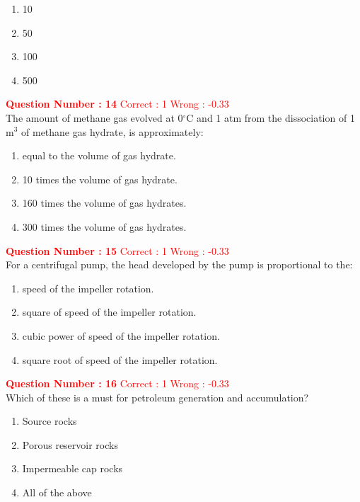 \documentclass[12pt]{article}
\begin{document}
{\begin{enumerate}[label=(\Alph*)]
    \item 10
    \item 50
    \item 100
    \item 500
\end{enumerate}

\vspace{2ex}


\textbf{\textcolor{red}{Question Number : 14}} \hfill \textcolor{red}{Correct : 1  Wrong : -0.33} \\[1ex]
The amount of methane gas evolved at 0$^\circ$C and 1 atm from the dissociation of 1 m$^3$ of methane gas hydrate, is approximately:

\begin{enumerate}[label=(\Alph*)]
    \item equal to the volume of gas hydrate.
    \item 10 times the volume of gas hydrate.
    \item 160 times the volume of gas hydrates.
    \item 300 times the volume of gas hydrates.
\end{enumerate}

\vspace{2ex}


\textbf{\textcolor{red}{Question Number : 15}} \hfill \textcolor{red}{Correct : 1  Wrong : -0.33} \\[1ex]
For a centrifugal pump, the head developed by the pump is proportional to the:

\begin{enumerate}[label=(\Alph*)]
    \item speed of the impeller rotation.
    \item square of speed of the impeller rotation.
    \item cubic power of speed of the impeller rotation.
    \item square root of speed of the impeller rotation.
\end{enumerate}

\textbf{\textcolor{red}{Question Number : 16}} \hfill \textcolor{red}{Correct : 1 \quad Wrong : -0.33} \\[1ex]
Which of these is a must for petroleum generation and accumulation?

\begin{enumerate}[label=(\Alph*)]
    \item Source rocks
    \item Porous reservoir rocks
    \item Impermeable cap rocks
    \item All of the above
\end{enumerate}

}
\end{document}
